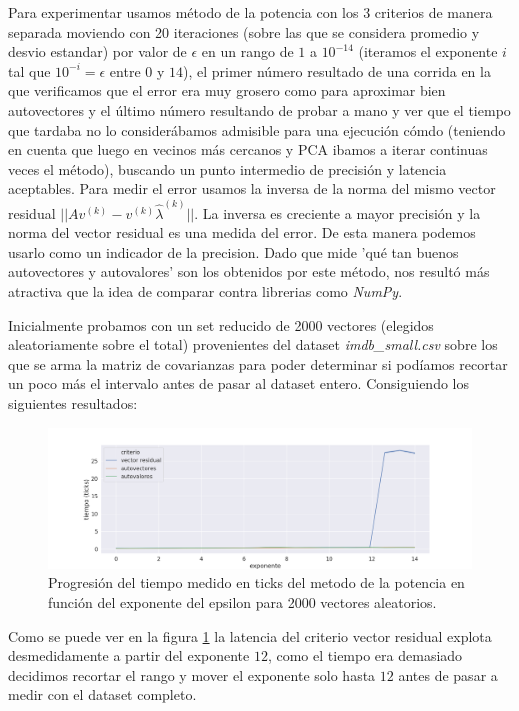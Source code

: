Para experimentar usamos método de la potencia con los 3 criterios de manera separada moviendo con 20 iteraciones (sobre las que se considera promedio y desvio estandar) por valor de $\epsilon$ en un rango de $1$ a $10^{-14}$ (iteramos el exponente $i$ tal que $10^{-i}=\epsilon$ entre $0$ y $14$), el primer número resultado de una corrida en la que verificamos que el error era muy grosero como para aproximar bien autovectores y el último número resultando de probar a mano y ver que el tiempo que tardaba no lo considerábamos admisible para una ejecución cómdo (teniendo en cuenta que luego en vecinos más cercanos y PCA ibamos a iterar continuas veces el método), buscando un punto intermedio de precisión y latencia aceptables. Para medir el error usamos la inversa de la norma del mismo vector residual $|| A v^{(k)} - v^{(k)}\hat{\lambda}^{(k)} ||$. La inversa es creciente a mayor precisión y la norma del vector residual es una medida del error. De esta manera podemos usarlo como un indicador de la precision. Dado que mide 'qué tan buenos autovectores y autovalores' son los obtenidos por este método, nos resultó más atractiva que la idea de comparar contra librerias como \textit{NumPy}.

Inicialmente probamos con un set reducido de 2000 vectores (elegidos aleatoriamente sobre el total) provenientes del dataset \textit{ imdb\_small.csv} sobre los que se arma la matriz de covarianzas para poder determinar si podíamos recortar un poco más el intervalo antes de pasar al dataset entero. Consiguiendo los siguientes resultados:

\begin{figure}[h]
\includegraphics[width=\textwidth]{./img/tiempo_2k.png}
\centering
\caption{Progresión del tiempo medido en ticks del metodo de la potencia en función del exponente del epsilon para 2000 vectores aleatorios.\label{fig:pm_2k_t}}
\end{figure}

Como se puede ver en la figura \ref{fig:pm_2k_t} la latencia del criterio vector residual explota desmedidamente a partir del exponente $12$, como el tiempo era demasiado decidimos recortar el rango y mover el exponente solo hasta $12$ antes de pasar a medir con el dataset completo.


